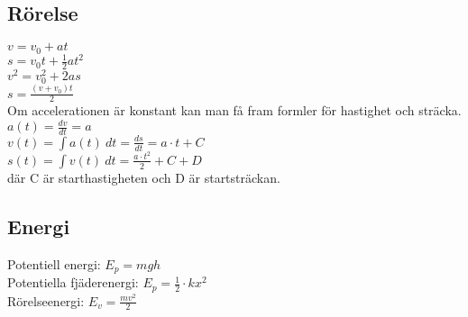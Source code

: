 \subsection{Rörelse}
    \begin{math}
        v = v_0 + at
    \end{math} \\[2pt]
    \begin{math}
        s = v_0 t + \frac{1}{2} at^2
    \end{math} \\[2pt]
    \begin{math}
        v^2 = v_0^2 + 2as
    \end{math} \\[2pt]
    \begin{math}
        s = \frac{(v + v_0)t}{2}
    \end{math} \\[2pt]
    Om accelerationen är konstant kan man få fram formler för hastighet och sträcka. \\
    \begin{math}
        a(t) = \frac{dv}{dt} = a
    \end{math} \\[2pt]
    \begin{math}
        v(t) = \int a(t) \ dt = \frac{ds}{dt} = a \cdot t + C
    \end{math} \\[2pt]
    \begin{math}
        s(t) = \int v(t) \ dt = \frac{a \cdot t^2}{2} + C + D
    \end{math} \\[2pt]
    där C är starthastigheten och D är startsträckan.

\subsection{Energi}
Potentiell energi:
\begin{math}
    E_p = mgh
\end{math} \\[2pt]
Potentiella fjäderenergi:
\begin{math}
    E_p = \frac{1}{2} \cdot kx^2
\end{math} \\[2pt]
Rörelseenergi:
\begin{math}
    E_v = \frac{mv^2}{2}
\end{math} \\[2pt]

